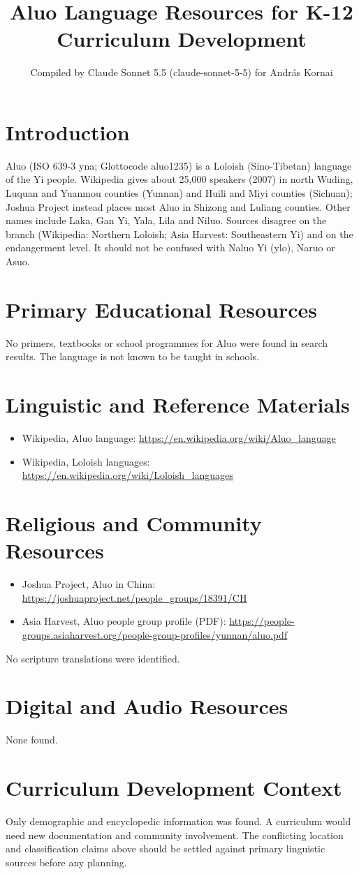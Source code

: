 \documentclass[12pt]{article}
\title{Aluo Language Resources for K-12 Curriculum Development}
\author{Compiled by Claude Sonnet 5.5 (claude-sonnet-5-5) for Andr\'as Kornai}
\date{}
\begin{document}
\maketitle

\section{Introduction}
Aluo (ISO 639-3 yna; Glottocode aluo1235) is a Loloish (Sino-Tibetan) language of the Yi people. Wikipedia gives about 25,000 speakers (2007) in north Wuding, Luquan and Yuanmou counties (Yunnan) and Huili and Miyi counties (Sichuan); Joshua Project instead places most Aluo in Shizong and Luliang counties. Other names include Laka, Gan Yi, Yala, Lila and Niluo. Sources disagree on the branch (Wikipedia: Northern Loloish; Asia Harvest: Southeastern Yi) and on the endangerment level. It should not be confused with Naluo Yi (ylo), Naruo or Asuo.

\section{Primary Educational Resources}
No primers, textbooks or school programmes for Aluo were found in search results. The language is not known to be taught in schools.

\section{Linguistic and Reference Materials}
\begin{itemize}
\item Wikipedia, Aluo language: \url{https://en.wikipedia.org/wiki/Aluo_language}
\item Wikipedia, Loloish languages: \url{https://en.wikipedia.org/wiki/Loloish_languages}
\end{itemize}

\section{Religious and Community Resources}
\begin{itemize}
\item Joshua Project, Aluo in China: \url{https://joshuaproject.net/people_groups/18391/CH}
\item Asia Harvest, Aluo people group profile (PDF): \url{https://people-groups.asiaharvest.org/people-group-profiles/yunnan/aluo.pdf}
\end{itemize}
No scripture translations were identified.

\section{Digital and Audio Resources}
None found.

\section{Curriculum Development Context}
Only demographic and encyclopedic information was found. A curriculum would need new documentation and community involvement. The conflicting location and classification claims above should be settled against primary linguistic sources before any planning.
\end{document}
